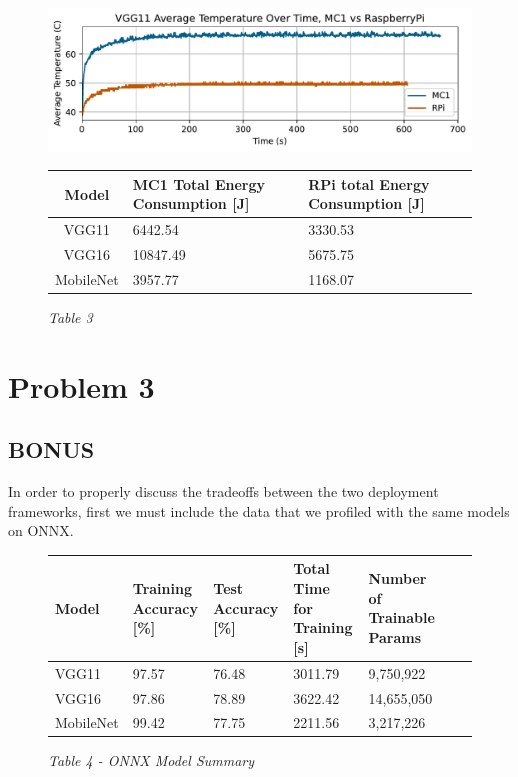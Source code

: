 \documentclass{article}
\begin{document}
\begin{figure}[!htb]
    \centering
    \includegraphics[width=\textwidth]{vgg11_average_temperature.pdf}
    \caption{}
    \label{fig:vgg11-avg-temp}
\end{figure}
\clearpage
\begin{figure}[!htb]
    \caption{\textit{Table 3}}
    \begin{tabularx}{\textwidth}{|c|*{2}{Y|}}
        \hline
        Model     & MC1 Total Energy Consumption [J] & RPi total Energy Consumption [J] \\
        \hline
        VGG11     & 6442.54   & 3330.53 \\
        \hline
        VGG16     & 10847.49  & 5675.75  \\
        \hline
        MobileNet & 3957.77   & 1168.07 \\
        \hline
    \end{tabularx}
    \label{fig:deploy-energy}
\end{figure}

\section*{Problem 3}
\subsection*{BONUS}
In order to properly discuss the tradeoffs between the two deployment frameworks, first we must include the data that we profiled with the same models
on ONNX.

\begin{figure}[!htb]
    \caption{\textit{Table 4 - ONNX Model Summary}}
    \begin{tabularx}{\textwidth}{|*{7}{Y|}}
        \hline
        Model & Training Accuracy [\%] & Test Accuracy [\%] & Total Time for Training [s] & Number of Trainable Params \\
        \hline
        VGG11 & 97.57 & 76.48 & 3011.79 & 9,750,922   \\
        \hline
        VGG16 & 97.86 & 78.89 & 3622.42 & 14,655,050   \\
        \hline
        MobileNet & 99.42 & 77.75 & 2211.56 & 3,217,226 \\
        \hline
    \end{tabularx}
    \label{fig:model-summary-onnx}
\end{figure}
\end{document}
